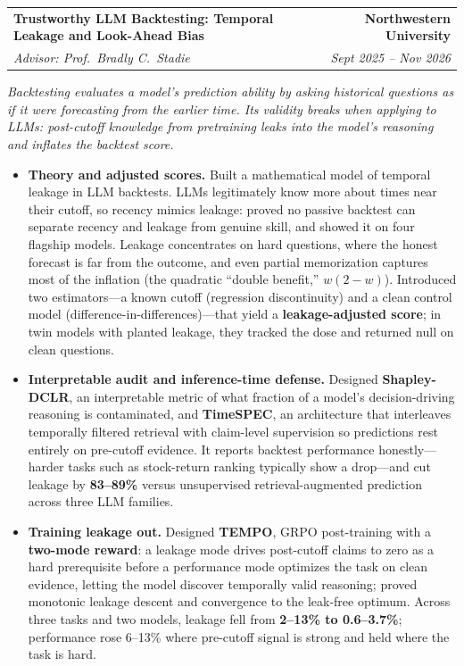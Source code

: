 \documentclass[10.5pt]{article}
\makeatletter
\newcommand{\story}[1]{%
  \par\vspace{3pt}
  \noindent{\color{accent}\vrule width 2pt}\hspace{8pt}%
  \begin{minipage}[t]{\dimexpr\textwidth-13pt\relax}
    {\small\itshape #1}
  \end{minipage}\par\vspace{3pt}}
\newcommand{\facet}[1]{\textcolor{accent}{\textbf{#1}}}
\newcommand{\entry}[4]{%
  \begin{tabularx}{\textwidth}{@{}X@{}r@{}}
    \textbf{#1} & \textbf{#2} \\
    {\itshape\color{metagray}#3} & {\itshape\color{metagray}#4} \\
  \end{tabularx}\vspace{2pt}}
\newenvironment{bullets}
  {\begin{itemize}[leftmargin=1.35em, topsep=2.5pt, itemsep=2pt, parsep=0pt,
                   label=\textcolor{accent}{\footnotesize$\bullet$}]\small}
  {\end{itemize}}
\makeatother
\begin{document}
\entry{Trustworthy LLM Backtesting: Temporal Leakage and Look-Ahead Bias}
  {Northwestern University}
  {Advisor: Prof.\ Bradly C.\ Stadie}{Sept 2025 -- Nov 2026}
\story{Backtesting evaluates a model's prediction ability by asking historical questions as if it were forecasting from
  the earlier time. Its validity breaks when applying to LLMs: post-cutoff knowledge from pretraining leaks into the
  model's reasoning and inflates the backtest score.}
\begin{bullets}
  \item \facet{Theory and adjusted scores.} Built a mathematical model of temporal leakage in LLM backtests.
        LLMs legitimately know more about times near their cutoff, so recency mimics leakage: proved no
        passive backtest can separate recency and leakage from genuine skill, and showed it on four flagship
        models. Leakage concentrates on hard questions, where the honest forecast is far from the outcome,
        and even partial memorization captures most of the inflation (the quadratic ``double benefit,''
        $w(2-w)$). Introduced two estimators---a known cutoff (regression discontinuity) and a clean control
        model (difference-in-differences)---that yield a \textbf{leakage-adjusted score}; in twin models with
        planted leakage, they tracked the dose and returned null on clean questions.
  \item \facet{Interpretable audit and inference-time defense.} Designed \textbf{Shapley-DCLR}, an
        interpretable metric of what fraction of a model's decision-driving reasoning is contaminated, and
        \textbf{TimeSPEC}, an architecture that interleaves temporally filtered retrieval with claim-level
        supervision so predictions rest entirely on pre-cutoff evidence. It reports backtest performance
        honestly---harder tasks such as stock-return ranking typically show a drop---and cut leakage by
        \textbf{83--89\%} versus unsupervised retrieval-augmented prediction across three LLM families.
  \item \facet{Training leakage out.} Designed \textbf{TEMPO}, GRPO post-training with a \textbf{two-mode
        reward}: a leakage mode drives post-cutoff claims to zero as a hard prerequisite before a performance
        mode optimizes the task on clean evidence, letting the model discover temporally valid reasoning;
        proved monotonic leakage descent and convergence to the leak-free optimum. Across three tasks and two
        models, leakage fell from \textbf{2--13\% to 0.6--3.7\%}; performance rose 6--13\% where pre-cutoff
        signal is strong and held where the task is hard.
\end{bullets}
\end{document}
